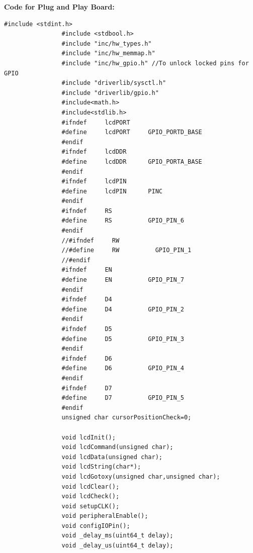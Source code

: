 \documentclass[a4paper,10pt,oneside]{article}
\begin{document}
			\textbf{Code for Plug and Play Board:}
			\begin{lstlisting}[style=CStyle]
				#include <stdint.h>
				#include <stdbool.h>
				#include "inc/hw_types.h"
				#include "inc/hw_memmap.h"
				#include "inc/hw_gpio.h" //To unlock locked pins for GPIO
				#include "driverlib/sysctl.h"
				#include "driverlib/gpio.h"
				#include<math.h>
				#include<stdlib.h>
				#ifndef     lcdPORT
				#define     lcdPORT     GPIO_PORTD_BASE
				#endif
				#ifndef     lcdDDR
				#define     lcdDDR      GPIO_PORTA_BASE
				#endif
				#ifndef     lcdPIN
				#define     lcdPIN      PINC
				#endif
				#ifndef     RS
				#define     RS          GPIO_PIN_6
				#endif
				//#ifndef     RW
				//#define     RW          GPIO_PIN_1
				//#endif
				#ifndef     EN
				#define     EN          GPIO_PIN_7
				#endif
				#ifndef     D4
				#define     D4          GPIO_PIN_2
				#endif
				#ifndef     D5
				#define     D5          GPIO_PIN_3
				#endif
				#ifndef     D6
				#define     D6          GPIO_PIN_4
				#endif
				#ifndef     D7
				#define     D7          GPIO_PIN_5
				#endif
				unsigned char cursorPositionCheck=0;
				
				void lcdInit();
				void lcdCommand(unsigned char);
				void lcdData(unsigned char);
				void lcdString(char*);
				void lcdGotoxy(unsigned char,unsigned char);
				void lcdClear();
				void lcdCheck();
				void setupCLK();
				void peripheralEnable();
				void configIOPin();
				void _delay_ms(uint64_t delay);
				void _delay_us(uint64_t delay);
				

\end{lstlisting}
\end{document}
